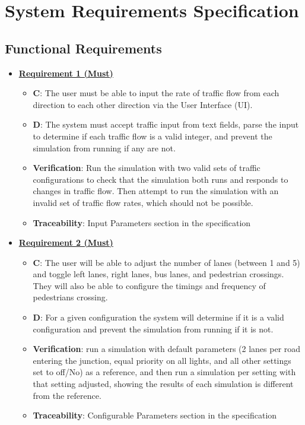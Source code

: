 \documentclass{article}
\begin{document}
\section{System Requirements Specification}
\subsection{Functional Requirements}
\begin{itemize}

    \item \textbf{\underline{Requirement 1 (Must)}}
    \begin{itemize}
        \item \textbf{C}: The user must be able to input the rate of traffic flow from 
            each direction to each other direction via the User Interface (UI).
        \item \textbf{D}: The system must accept traffic input from text fields, parse the input to 
            determine if each traffic flow is a valid integer, and prevent the simulation from 
            running if any are not.
        \item \textbf{Verification}: Run the simulation with two valid sets of traffic configurations 
            to check that the simulation both runs and responds to changes in traffic flow. Then attempt to run 
            the simulation with an invalid set of traffic flow rates, which should not be possible.
        \item\textbf{Traceability}: Input Parameters section in the specification
    \end{itemize}
    
    \item \textbf{\underline{Requirement 2 (Must)}}
    \begin{itemize}
        \item \textbf{C}: The user will be able to adjust the number of lanes (between 1 and 5) 
            and toggle left lanes, right lanes, bus lanes, and pedestrian crossings. They will 
            also be able to configure the timings and frequency of pedestrians crossing.
        \item \textbf{D}: For a given configuration the system will determine if it is a valid 
            configuration and prevent the simulation from running if it is not.
        \item \textbf{Verification}: run a simulation with default parameters (2 lanes per 
            road entering the junction, equal priority on all lights, and all other 
            settings set to off/No) as a reference, and then run a simulation per setting 
            with that setting adjusted, showing the results of each simulation is different 
            from the reference.
        \item\textbf{Traceability}: Configurable Parameters section in the specification
    \end{itemize}


\end{itemize}
\end{document}
